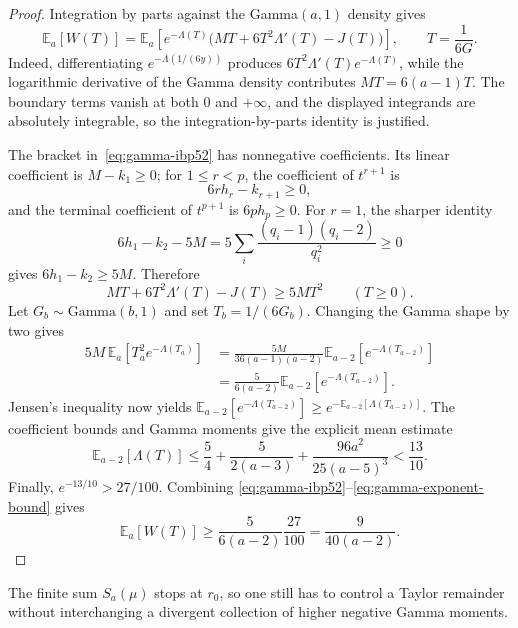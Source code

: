 \documentclass[11pt]{article}
\theoremstyle{definition}
\theoremstyle{remark}
\begin{document}
\begin{proof}
Integration by parts against the Gamma$(a,1)$ density gives
\begin{equation}\label{eq:gamma-ibp52}
 \mathbb E_a[W(T)]
 =\mathbb E_a\!\left[
 e^{-\Lambda(T)}\bigl(MT+6T^2\Lambda'(T)-J(T)\bigr)\right],
 \qquad T=\frac1{6G}.
\end{equation}
Indeed, differentiating $e^{-\Lambda(1/(6y))}$ produces
$6T^2\Lambda'(T)e^{-\Lambda(T)}$, while the logarithmic derivative of the
Gamma density contributes $MT=6(a-1)T$.  The boundary terms vanish at both
$0$ and $+\infty$, and the displayed integrands are absolutely integrable, so
the integration-by-parts identity is justified.

The bracket in~\eqref{eq:gamma-ibp52} has nonnegative coefficients.  Its
linear coefficient is $M-k_1\ge0$; for $1\le r<p$, the coefficient of
$t^{r+1}$ is
\[
  6r h_r-k_{r+1}\ge0,
\]
and the terminal coefficient of $t^{p+1}$ is $6ph_p\ge0$.  For $r=1$,
the sharper identity
\[
  6h_1-k_2-5M
  =5\sum_i\frac{(q_i-1)(q_i-2)}{q_i^2}\ge0
\]
gives $6h_1-k_2\ge5M$.  Therefore
\begin{equation}\label{eq:gamma-bracket-lower}
  MT+6T^2\Lambda'(T)-J(T)\ge5MT^2
  \qquad(T\ge0).
\end{equation}
Let $G_b\sim\mathrm{Gamma}(b,1)$ and set $T_b=1/(6G_b)$.  Changing the
Gamma shape by two gives
\begin{align}
 5M\,\mathbb E_a[T_a^2e^{-\Lambda(T_a)}]
 &=\frac{5M}{36(a-1)(a-2)}
   \mathbb E_{a-2}[e^{-\Lambda(T_{a-2})}]\\
 &=\frac5{6(a-2)}\mathbb E_{a-2}[e^{-\Lambda(T_{a-2})}].
 \label{eq:gamma-shape-shift}
\end{align}
Jensen's inequality now yields
$\mathbb E_{a-2}[e^{-\Lambda(T_{a-2})}]
 \ge e^{-\mathbb E_{a-2}[\Lambda(T_{a-2})]}$.  The coefficient bounds and Gamma
moments give the explicit mean estimate
\begin{equation}\label{eq:gamma-exponent-bound}
 \mathbb E_{a-2}[\Lambda(T)]
 \le \frac54+\frac5{2(a-3)}
       +\frac{96a^2}{25(a-5)^3}
 <\frac{13}{10}.
\end{equation}
Finally, $e^{-13/10}>27/100$.  Combining
\eqref{eq:gamma-ibp52}--\eqref{eq:gamma-exponent-bound} gives
\[
 \mathbb E_a[W(T)]
 \ge\frac5{6(a-2)}\frac{27}{100}
 =\frac9{40(a-2)}.
\]
\end{proof}

The finite sum $S_a(\mu)$ stops at $r_0$, so one still has to control a Taylor
remainder without interchanging a divergent collection of higher negative
Gamma moments.
\end{document}
